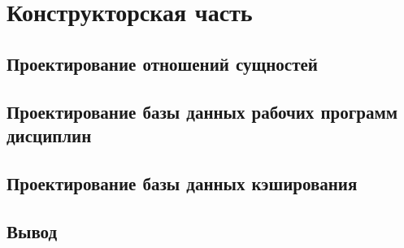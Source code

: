 \chapter{Конструкторская часть}

\section{Проектирование отношений сущностей}

\section{Проектирование базы данных рабочих программ дисциплин}

\section{Проектирование базы данных кэширования}

\section*{Вывод}

